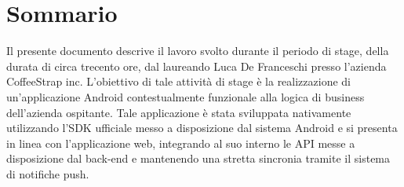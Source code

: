 
\cleardoublepage
{}
{}
\begingroup
\let\clearpage\relax
\let\cleardoublepage\relax
\let\cleardoublepage\relax

\chapter*{Sommario}

Il presente documento descrive il lavoro svolto durante il periodo di stage, della durata di circa trecento ore, dal laureando Luca De Franceschi presso l'azienda CoffeeStrap inc.
L'obiettivo di tale attività di stage è la realizzazione di un'applicazione Android contestualmente funzionale alla logica di business dell'azienda ospitante. Tale applicazione è stata sviluppata nativamente utilizzando l'SDK ufficiale messo a disposizione dal sistema Android e si presenta in linea con l'applicazione web, integrando al suo interno le API messe a disposizione dal \gls{back-end} e mantenendo una stretta sincronia tramite il sistema di notifiche push. 
%
%

\endgroup			

\vfill

